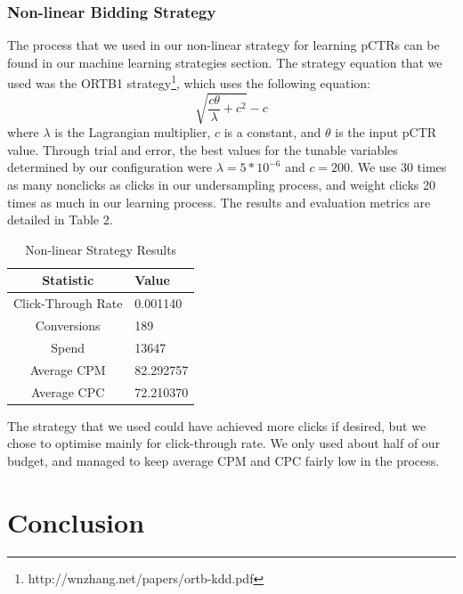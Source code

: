 \documentclass{sig-alternate-05-2015}
\begin{document}
\subsubsection{Non-linear Bidding Strategy}

The process that we used in our non-linear strategy for learning pCTRs can be found in our machine learning strategies section. The strategy equation that we used was the ORTB1 strategy\footnote{http://wnzhang.net/papers/ortb-kdd.pdf}, which uses the following equation:
\begin{equation}\sqrt{\frac{c\theta}{\lambda}+c^2}-c\end{equation}
where $\lambda$ is the Lagrangian multiplier, $c$ is a constant, and $\theta$ is
the input pCTR value. Through trial and error, the best values for the tunable variables determined by our configuration were $\lambda=5*10^{-6}$ and
$c=200$. We use 30 times as many nonclicks as clicks in our undersampling process,
and weight clicks 20 times as much in our learning process. The results and evaluation metrics are detailed in Table 2.

\begin{table}[h!]
\centering
\caption{Non-linear Strategy Results}
\begin{tabular}{|c|l|} \hline
\textbf{Statistic}&\textbf{Value}\\ \hline
Click-Through Rate&0.001140\\ \hline
Conversions&189\\ \hline
Spend&13647\\ \hline
Average CPM&82.292757\\ \hline
Average CPC&72.210370\\
\hline\end{tabular}
\end{table}

The strategy that we used could have achieved more clicks if desired, but we chose to optimise mainly for click-through rate. We only used about half of our budget, and managed to keep average CPM and CPC fairly low in the process.

\section{Conclusion}
\end{document}
